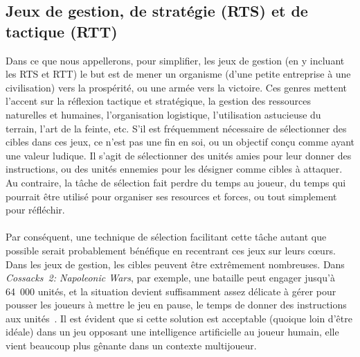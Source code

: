 	\subsection{Jeux de gestion, de stratégie (RTS) et de tactique (RTT)}
	Dans ce que nous appellerons, pour simplifier, les jeux de gestion (en y incluant les RTS et RTT) le but est de mener un organisme (d'une petite entreprise à une civilisation) vers la prospérité, ou une armée vers la victoire. Ces genres mettent l'accent sur la réflexion tactique et stratégique, la gestion des ressources naturelles et humaines, l'organisation logistique, l'utilisation astucieuse du terrain, l'art de la feinte, etc. S'il est fréquemment nécessaire de sélectionner des cibles dans ces jeux, ce n'est pas une fin en soi, ou un objectif conçu comme ayant une valeur ludique. Il s'agit de sélectionner des unités amies pour leur donner des instructions, ou des unités ennemies pour les désigner comme cibles à attaquer. Au contraire, la tâche de sélection fait perdre du temps au joueur, du temps qui pourrait être utilisé pour organiser ses resources et forces, ou tout simplement pour réfléchir.
	
	\paragraph*{}
	Par conséquent, une technique de sélection facilitant cette tâche autant que possible serait probablement bénéfique en recentrant ces jeux sur leurs cœurs. Dans les jeux de gestion, les cibles peuvent être extrêmement nombreuses. Dans \emph{Cossacks~2: Napoleonic Wars}, par exemple, une bataille peut engager jusqu'à 64~000 unités, et la situation devient suffisamment assez délicate à gérer pour pousser les joueurs à mettre le jeu en pause, le temps de donner des instructions aux unités~\cite{cossacks2}. Il est évident que si cette solution est acceptable (quoique loin d'être idéale) dans un jeu opposant une intelligence artificielle au joueur humain, elle vient beaucoup plus gênante dans un contexte multijoueur.
	
